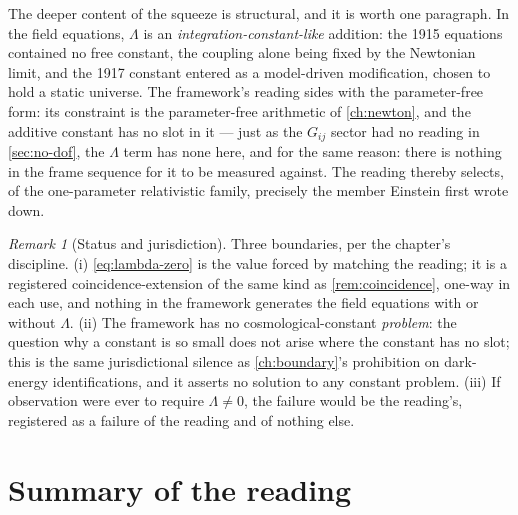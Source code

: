 \documentclass[11pt]{amsbook}
\theoremstyle{plain}
\theoremstyle{definition}
\theoremstyle{remark}
\newtheorem{remark}[theorem]{Remark}
\begin{document}
The deeper content of the squeeze is structural, and it is worth one paragraph. In the field equations, $\Lambda$ is an \emph{integration-constant-like} addition: the 1915 equations contained no free constant, the coupling alone being fixed by the Newtonian limit, and the 1917 constant entered as a model-driven modification, chosen to hold a static universe. The framework's reading sides with the parameter-free form: its constraint is the parameter-free arithmetic of \cref{ch:newton}, and the additive constant has no slot in it --- just as the $G_{ij}$ sector had no reading in \cref{sec:no-dof}, the $\Lambda$ term has none here, and for the same reason: there is nothing in the frame sequence for it to be measured against. The reading thereby selects, of the one-parameter relativistic family, precisely the member Einstein first wrote down.

\begin{remark}[Status and jurisdiction]\label{rem:lambda-status}
Three boundaries, per the chapter's discipline. (i) \cref{eq:lambda-zero} is the value forced by matching the reading; it is a registered coincidence-extension of the same kind as \cref{rem:coincidence}, one-way in each use, and nothing in the framework generates the field equations with or without $\Lambda$. (ii) The framework has no cosmological-constant \emph{problem}: the question why a constant is so small does not arise where the constant has no slot; this is the same jurisdictional silence as \cref{ch:boundary}'s prohibition on dark-energy identifications, and it asserts no solution to any constant problem. (iii) If observation were ever to require $\Lambda \neq 0$, the failure would be the reading's, registered as a failure of the reading and of nothing else.
\end{remark}

\section{Summary of the reading}\label{sec:gr-summary}
\end{document}

